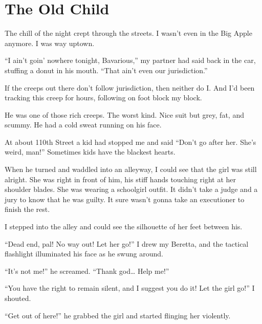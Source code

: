 \chapter{The Old Child}



The chill of the night crept through the streets. I wasn't
even in the Big Apple anymore. I was way uptown.



``I ain't goin' nowhere tonight, Bavarious,''
my partner had said back in the car, stuffing a donut in his mouth.
``That ain't even our jurisdiction.''



If the creeps out there don't follow jurisdiction, then
neither do I. And I'd been tracking this creep for hours,
following on foot block my block.



He was one of those rich creeps. The worst kind. Nice suit but
grey, fat, and scummy. He had a cold sweat running on his
face.



At about 110th Street a kid had stopped me and said ``Don't go after
her. She's weird, man!'' Sometimes kids have the blackest
hearts.



When he turned and waddled into an alleyway, I could see that the
girl was still alright. She was right in front of him, his stiff
hands touching right at her shoulder blades. She was wearing a
schoolgirl outfit. It didn't take a judge and a jury to know
that he was guilty. It sure wasn't gonna take an executioner
to finish the rest.



I stepped into the alley and could see the silhouette of her feet
between his.



``Dead end, pal! No way out! Let her go!'' I drew my
Beretta, and the tactical flashlight illuminated his face as he
swung around.



``It's not me!'' he screamed. ``Thank god{\ldots}
Help me!''



``You have the right to remain silent, and I suggest you do
it! Let the girl go!'' I shouted.



``Get out of here!'' he grabbed the girl and started
flinging her violently.



